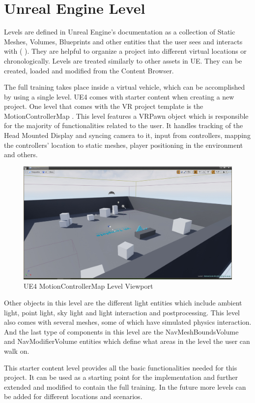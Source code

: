 \documentclass[12pt, a4paper,oneside, nocenter]{thesis}
\newcommand{\citeyeartitlexamkinline}[1]{(\usebibentry{#1}{title} \citeyear{#1})}
\begin{document}
\section{Unreal Engine Level}
Levels are defined in Unreal Engine's documentation as a collection of Static Meshes, Volumes, Blueprints and other entities that the user sees and interacts with \citeyeartitlexamkinline{ue-levels}. They are helpful to organize a project into different virtual locations or chronologically. Levels are treated similarly to other assets in UE. They can be created, loaded and modified from the Content Browser.
\par
The full training takes place inside a virtual vehicle, which can be accomplished by using a single level. UE4 comes with starter content when creating a new project. One level that comes with the VR project template is the MotionControllerMap . This level features a VRPawn object which is responsible for the majority of functionalities related to the user. It handles tracking of the Head Mounted Display and syncing camera to it, input from controllers, mapping the controllers' location to static meshes, player positioning in the environment and others.
\begin{figure}[H]
	\includegraphics[width=\textwidth]{level-ue4-editor}
	\caption{UE4 MotionControllerMap Level Viewport}
	\label{fig:level-ue4-editor}
\end{figure}
Other objects in this level are the different light entities which include ambient light, point light, sky light and light interaction and postprocessing. This level also comes with several meshes, some of which have simulated physics interaction. And the last type of components in this level are the NavMeshBoundsVolume and NavModifierVolume entities which define what areas in the level the user can walk on.
\par
This starter content level provides all the basic functionalities needed for this project. It can be used as a starting point for the implementation and further extended and modified to contain the full training. In the future more levels can be added for different locations and scenarios.
\end{document}
